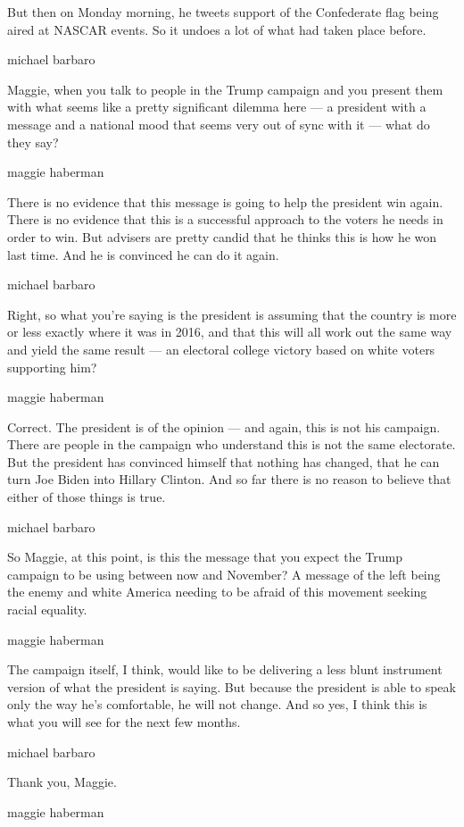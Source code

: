 But then on Monday morning, he tweets support of the Confederate flag
being aired at NASCAR events. So it undoes a lot of what had taken place
before.

michael barbaro

Maggie, when you talk to people in the Trump campaign and you present
them with what seems like a pretty significant dilemma here --- a
president with a message and a national mood that seems very out of sync
with it --- what do they say?

maggie haberman

There is no evidence that this message is going to help the president
win again. There is no evidence that this is a successful approach to
the voters he needs in order to win. But advisers are pretty candid that
he thinks this is how he won last time. And he is convinced he can do it
again.

michael barbaro

Right, so what you're saying is the president is assuming that the
country is more or less exactly where it was in 2016, and that this will
all work out the same way and yield the same result --- an electoral
college victory based on white voters supporting him?

maggie haberman

Correct. The president is of the opinion --- and again, this is not his
campaign. There are people in the campaign who understand this is not
the same electorate. But the president has convinced himself that
nothing has changed, that he can turn Joe Biden into Hillary Clinton.
And so far there is no reason to believe that either of those things is
true.

michael barbaro

So Maggie, at this point, is this the message that you expect the Trump
campaign to be using between now and November? A message of the left
being the enemy and white America needing to be afraid of this movement
seeking racial equality.

maggie haberman

The campaign itself, I think, would like to be delivering a less blunt
instrument version of what the president is saying. But because the
president is able to speak only the way he's comfortable, he will not
change. And so yes, I think this is what you will see for the next few
months.

michael barbaro

Thank you, Maggie.

maggie haberman

